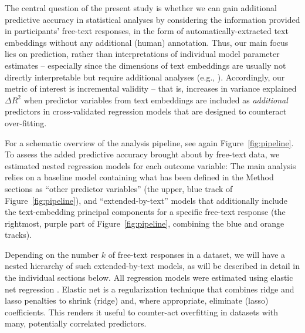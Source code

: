 \documentclass[man,floatsintext]{apa7}
\newcommand{\change}[1]{#1}
\begin{document}
The central question of the present study is whether we can gain additional predictive accuracy in statistical analyses by considering  the information provided in participants' free-text responses, in the form of automatically-extracted text embeddings without any additional (human) annotation. Thus, our main focus  lies on prediction, rather than interpretations of individual model parameter estimates \parencite{yarkoni2017choosing,shmueli2010explain} -- especially since the dimensions of text embeddings are usually not directly interpretable but require additional analyses (e.g., \cite{kjell2023text,Kjell2019}). Accordingly, our metric of interest is incremental validity -- that is, increases in variance explained $\Delta R^2$ when predictor variables from text embeddings are included as \emph{additional} predictors in cross-validated regression models that are designed to counteract over-fitting.    

For a schematic overview of the analysis pipeline, see again Figure~\ref{fig:pipeline}. To assess the added predictive accuracy brought about by free-text data, we estimated nested regression models for each outcome variable: The main analysis relies on a baseline model containing what has been defined in the Method sections as ``other predictor variables'' (the upper, blue track of Figure~\ref{fig:pipeline}), and ``extended-by-text'' models that additionally include the  text-embedding principal components for a specific free-text response (the rightmost, purple part of Figure~\ref{fig:pipeline}, combining the blue and orange tracks). 

Depending on the number $k$ of free-text responses in a dataset, we will have a nested hierarchy of such extended-by-text models, as will be described in detail in the individual sections below. All regression models were estimated using elastic net regression \parencite{zou2005regularization}. Elastic net is a regularization technique that combines ridge and lasso penalties to shrink (ridge) and, where appropriate, eliminate (lasso) coefficients. This renders \change{it} useful to counter-act overfitting in datasets with many, potentially correlated predictors. 
\end{document}
